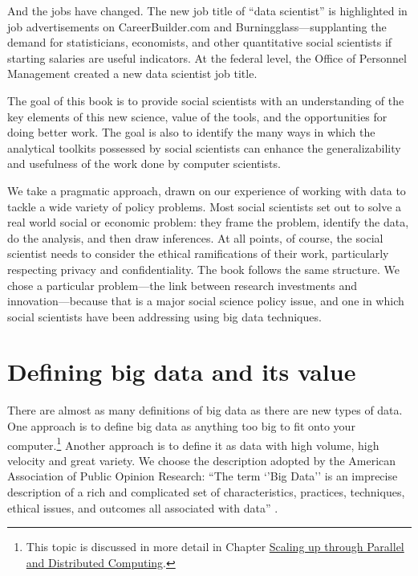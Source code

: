 \documentclass[]{krantz}
\begin{document}
And the jobs have changed. The new job title of ``data scientist'' is
highlighted in job advertisements on CareerBuilder.com and
Burningglass---supplanting the demand for statisticians, economists, and
other quantitative social scientists if starting salaries are useful
indicators. At the federal level, the Office of Personnel Management
created a new data scientist job title.

The goal of this book is to provide social scientists with an
understanding of the key elements of this new science, value of the
tools, and the opportunities for doing better work. The goal is also to
identify the many ways in which the analytical toolkits possessed by
social scientists can enhance the generalizability and usefulness of the
work done by computer scientists.

We take a pragmatic approach, drawn on our experience of working with
data to tackle a wide variety of policy problems. Most social scientists
set out to solve a real world social or economic problem: they frame the
problem, identify the data, do the analysis, and then draw inferences.
At all points, of course, the social scientist needs to consider the
ethical ramifications of their work, particularly respecting privacy and
confidentiality. The book follows the same structure. We chose a
particular problem---the link between research investments and
innovation---because that is a major social science policy issue, and
one in which social scientists have been addressing using big data
techniques.

\section{Defining big data and its value}\label{sec:1-2}

There are almost as many definitions of big data as there are new types
of data. One approach is to define big data as anything too big to fit
onto your computer.\footnote{This topic is discussed in more detail in
  Chapter \protect\hyperlink{chap:parallel}{Scaling up through Parallel
  and Distributed Computing}.} Another approach is to define it as data
with high volume, high velocity and great variety. We choose the
description adopted by the American Association of Public Opinion
Research: ``The term `'Big Data'' is an imprecise description of a rich
and complicated set of characteristics, practices, techniques, ethical
issues, and outcomes all associated with data'' \citep{japec2015big}.
\end{document}
